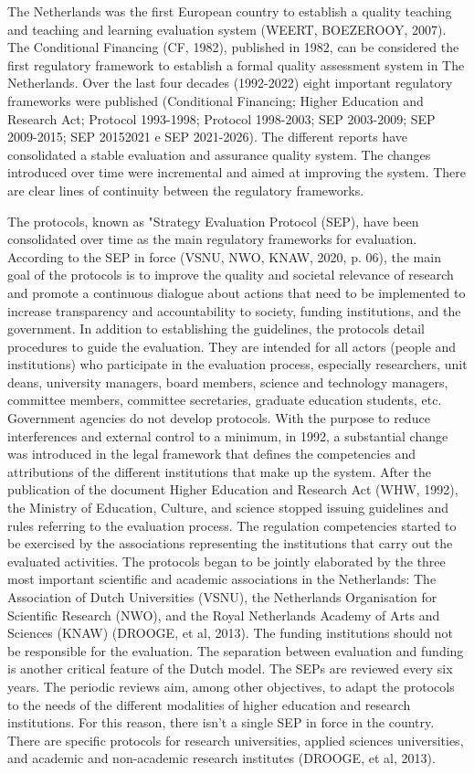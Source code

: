 The Netherlands was the first European country to establish a quality teaching and teaching and learning evaluation system (WEERT, BOEZEROOY, 2007). The Conditional Financing (CF, 1982), published in 1982, can be considered the first regulatory framework to establish a formal quality assessment system in The Netherlands. Over the last four decades (1992-2022) eight important regulatory frameworks were published (Conditional Financing; Higher Education and Research Act; Protocol 1993-1998; Protocol 1998-2003; SEP 2003-2009; SEP 2009-2015; SEP 20152021 e SEP 2021-2026). The different reports have consolidated a stable evaluation and assurance quality system. The changes introduced over time were incremental and aimed at improving the system. There are clear lines of continuity between the regulatory frameworks.  

The protocols, known as "Strategy Evaluation Protocol (SEP), have been consolidated over time as the main regulatory frameworks for evaluation. According to the SEP in force (VSNU, NWO, KNAW, 2020, p. 06), the main goal of the protocols is to improve the quality and societal relevance of research and promote a continuous dialogue about actions that need to be implemented to increase transparency and accountability to society, funding institutions, and the government. In addition to establishing the guidelines, the protocols detail procedures to guide the evaluation. They are intended for all actors (people and institutions) who participate in the evaluation process, especially researchers, unit deans, university managers, board members, science and technology managers, committee members, committee secretaries, graduate education students, etc. Government agencies do not develop protocols. With the purpose to reduce interferences and external control to a minimum, in 1992, a substantial change was introduced in the legal framework that defines the competencies and attributions of the different institutions that make up the system. 
After the publication of the document Higher Education and Research Act (WHW, 1992), the Ministry of Education, Culture, and science stopped issuing guidelines and rules referring to the evaluation process. The regulation competencies started to be exercised by the associations representing the institutions that carry out the evaluated activities. The protocols began to be jointly elaborated by the three most important scientific and academic associations in the Netherlands: The Association of Dutch Universities (VSNU), the Netherlands Organisation for Scientific Research (NWO), and the Royal Netherlands Academy of Arts and Sciences (KNAW) (DROOGE, et al, 2013). The funding institutions should not be responsible for the evaluation. The separation between evaluation and funding is another critical feature of the Dutch model. The SEPs are reviewed every six years. The periodic reviews aim, among other objectives, to adapt the protocols to the needs of the different modalities of higher education and research institutions. For this reason, there isn't a single SEP in force in the country. There are specific protocols for research universities, applied sciences universities, and academic and non-academic research institutes (DROOGE, et al, 2013). 

